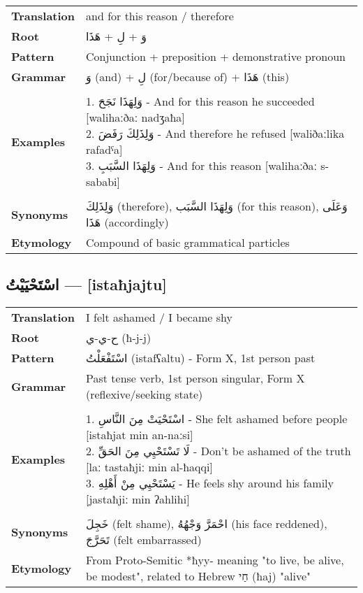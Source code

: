 \documentclass[letterpaper,12pt]{article}
\begin{document}
\begin{tabular}{p{3cm}p{10cm}}
\toprule
\textbf{Translation} & and for this reason / therefore \\
\textbf{Root} & \textarabic{وَ} + \textarabic{لِ} + \textarabic{هَذَا} \\
\textbf{Pattern} & Conjunction + preposition + demonstrative pronoun \\
\textbf{Grammar} & \textarabic{وَ} (and) + \textarabic{لِ} (for/because of) + \textarabic{هَذَا} (this) \\
\midrule \\
\textbf{Examples} & \makecell[l]{\parbox{9.5cm}{
1. \textarabic{وَلِهَذَا نَجَحَ} - And for this reason he succeeded [walihaːðaː nadʒaħa]\\
2. \textarabic{وَلِذَلِكَ رَفَضَ} - And therefore he refused [waliðaːlika rafadˤa]\\
3. \textarabic{وَلِهَذَا السَّبَبِ} - And for this reason [walihaːðaː s-sababi]
}} \\
\midrule \\
\textbf{Synonyms} & \textarabic{وَلِذَلِكَ} (therefore), \textarabic{وَلِهَذَا السَّبَب} (for this reason), \textarabic{وَعَلَى هَذَا} (accordingly) \\
\textbf{Etymology} & Compound of basic grammatical particles \\
\bottomrule
\end{tabular}

\subsection{\textarabic{اسْتَحْيَيْتُ} — [istaħjajtu]}

\begin{tabular}{p{3cm}p{10cm}}
\toprule
\textbf{Translation} & I felt ashamed / I became shy \\
\textbf{Root} & \textarabic{ح-ي-ي} (ħ-j-j) \\
\textbf{Pattern} & \textarabic{اسْتَفْعَلْتُ} (istafʕaltu) - Form X, 1st person past \\
\textbf{Grammar} & Past tense verb, 1st person singular, Form X (reflexive/seeking state) \\
\midrule \\
\textbf{Examples} & \makecell[l]{\parbox{9.5cm}{
1. \textarabic{اسْتَحْيَتْ مِنَ النَّاسِ} - She felt ashamed before people [istaħjat min an-naːsi]\\
2. \textarabic{لَا تَسْتَحْيِي مِنَ الحَقِّ} - Don't be ashamed of the truth [laː tastaħjiː min al-ħaqqi]\\
3. \textarabic{يَسْتَحْيِي مِنْ أَهْلِهِ} - He feels shy around his family [jastaħjiː min ʔahlihi]
}} \\
\midrule \\
\textbf{Synonyms} & \textarabic{خَجِلَ} (felt shame), \textarabic{احْمَرَّ وَجْهُهُ} (his face reddened), \textarabic{تَحَرَّجَ} (felt embarrassed) \\
\textbf{Etymology} & From Proto-Semitic *ħyy- meaning "to live, be alive, be modest", related to Hebrew \texthebrew{חַי} (ħaj) "alive" \\
\bottomrule
\end{tabular}
\end{document}
